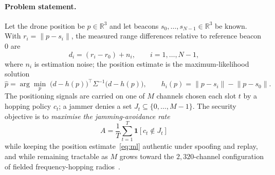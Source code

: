 \documentclass[11pt]{article}
\begin{document}
\paragraph{Problem statement.}
Let the drone position be $p\in\mathbb{R}^3$ and let beacons
$s_0,\dots,s_{N-1}\in\mathbb{R}^3$ be known. With $r_i=\lVert p-s_i\rVert$, the
measured range differences relative to reference beacon $0$ are
\begin{equation}
d_i = (r_i - r_0) + n_i, \qquad i=1,\dots,N-1,
\label{eq:tdoa}
\end{equation}
where $n_i$ is estimation noise; the position estimate is the maximum-likelihood
solution
\begin{equation}
\hat p = \arg\min_{p}\; \big(d - h(p)\big)^{\!\top}\Sigma^{-1}\big(d - h(p)\big),
\qquad h_i(p) = \lVert p-s_i\rVert - \lVert p-s_0\rVert .
\label{eq:ml}
\end{equation}
The positioning signals are carried on one of $M$ channels chosen each slot $t$
by a hopping policy $c_t$; a jammer denies a set $J_t\subseteq\{0,\dots,M-1\}$.
The security objective is to \emph{maximise the jamming-avoidance rate}
\begin{equation}
A = \frac1T\sum_{t=1}^{T}\mathbf{1}\!\left[c_t\notin J_t\right]
\label{eq:avoid}
\end{equation}
while keeping the position estimate~\eqref{eq:ml} authentic under spoofing and
replay, and while remaining tractable as $M$ grows toward the
$2{,}320$-channel configuration of fielded frequency-hopping radios~\cite{ref17}.
\end{document}
